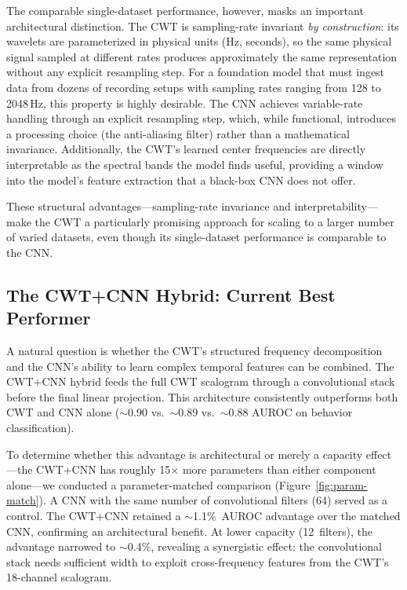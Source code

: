 \documentclass[11pt, a4paper]{article}
\begin{document}
The comparable single-dataset performance, however, masks an important architectural distinction. The CWT is sampling-rate invariant \emph{by construction}: its wavelets are parameterized in physical units (Hz, seconds), so the same physical signal sampled at different rates produces approximately the same representation without any explicit resampling step. For a foundation model that must ingest data from dozens of recording setups with sampling rates ranging from 128 to 2048\,Hz, this property is highly desirable. The CNN achieves variable-rate handling through an explicit resampling step, which, while functional, introduces a processing choice (the anti-aliasing filter) rather than a mathematical invariance. Additionally, the CWT's learned center frequencies are directly interpretable as the spectral bands the model finds useful, providing a window into the model's feature extraction that a black-box CNN does not offer.

These structural advantages---sampling-rate invariance and interpretability---make the CWT a particularly promising approach for scaling to a larger number of varied datasets, even though its single-dataset performance is comparable to the CNN.


\subsection{The CWT+CNN Hybrid: Current Best Performer}

A natural question is whether the CWT's structured frequency decomposition and the CNN's ability to learn complex temporal features can be combined.  The CWT+CNN hybrid feeds the full CWT scalogram through a convolutional stack before the final linear projection.  This architecture consistently outperforms both CWT and CNN alone ($\sim$0.90 vs.\ $\sim$0.89 vs.\ $\sim$0.88 AUROC on behavior classification).

To determine whether this advantage is architectural or merely a capacity
effect---the CWT+CNN has roughly 15$\times$ more parameters than either
component alone---we conducted a parameter-matched comparison
(Figure~\ref{fig:param-match}).  A CNN with the same number of convolutional
filters (64) served as a control.  The CWT+CNN retained a
$\sim$1.1\%~AUROC advantage over the matched CNN, confirming an
architectural benefit.  At lower capacity (12~filters), the advantage
narrowed to $\sim$0.4\%, revealing a synergistic effect: the convolutional
stack needs sufficient width to exploit cross-frequency features from the
CWT's 18-channel scalogram.
\end{document}
